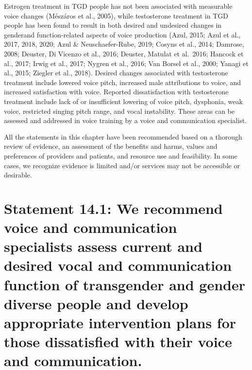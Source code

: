 \documentclass[
]{book}
\begin{document}
Estrogen treatment in TGD people has not
been associated with measurable voice changes
(Mészáros et al., 2005), while testosterone treatment in TGD people has been found to result
in both desired and undesired changes in genderand function-related aspects of voice production
(Azul, 2015; Azul et al., 2017, 2018, 2020; Azul
\& Neuschaefer-Rube, 2019; Cosyns et al., 2014;
Damrose, 2008; Deuster, Di Vicenzo et al., 2016;
Deuster, Matulat et al.~2016; Hancock et al., 2017;
Irwig et al., 2017; Nygren et al., 2016; Van Borsel
et al., 2000; Yanagi et al., 2015; Ziegler et al.,
2018). Desired changes associated with testosterone treatment include lowered voice pitch,
increased male attributions to voice, and increased
satisfaction with voice. Reported dissatisfaction
with testosterone treatment include lack of or
insufficient lowering of voice pitch, dysphonia,
weak voice, restricted singing pitch range, and
vocal instability. These areas can be assessed and
addressed in voice training by a voice and communication specialist.

All the statements in this chapter have been
recommended based on a thorough review of
evidence, an assessment of the benefits and
harms, values and preferences of providers and
patients, and resource use and feasibility. In some
cases, we recognize evidence is limited and/or
services may not be accessible or desirable.

\hypertarget{statement-14.1-we-recommend-voice-and-communication-specialists-assess-current-and-desired-vocal-and-communication-function-of-transgender-and-gender-diverse-people-and-develop-appropriate-intervention-plans-for-those-dissatisfied-with-their-voice-and-communication.}{%
\section*{Statement 14.1: We recommend voice and communication specialists assess current and desired vocal and communication function of transgender and gender diverse people and develop appropriate intervention plans for those dissatisfied with their voice and communication.}\label{statement-14.1-we-recommend-voice-and-communication-specialists-assess-current-and-desired-vocal-and-communication-function-of-transgender-and-gender-diverse-people-and-develop-appropriate-intervention-plans-for-those-dissatisfied-with-their-voice-and-communication.}}
\end{document}
